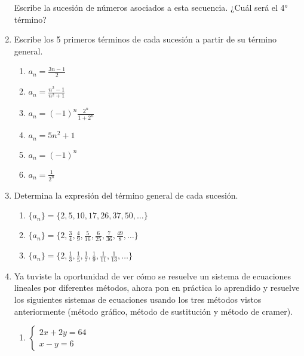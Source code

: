 \documentclass[12pt,a4paper]{article}
\begin{document}
\begin{enumerate}
    Escribe la sucesión de números asociados a esta secuencia. ¿Cuál será el 4° término?

    \item Escribe los 5 primeros términos de cada sucesión a partir de su término general.

    \begin{enumerate}[label=\alph*.]
        \item $a_n = \frac{3n - 1}{2}$

        \item $a_n = \frac{n^2 - 1}{n^2 + 1}$

        \item $a_n = (-1)^n \frac{2^n}{1 + 2^n}$

        \item $a_n = 5n^2 + 1$

        \item $a_n = (-1)^n$

        \item $a_n = \frac{1}{2^n}$
    \end{enumerate}

    \item Determina la expresión del término general de cada sucesión.

    \begin{enumerate}[label=\alph*.]
        \item $\{a_n\} = \{2, 5, 10, 17, 26, 37, 50, \ldots\}$

        \item $\{a_n\} = \{2, \frac{3}{4}, \frac{4}{9}, \frac{5}{16}, \frac{6}{25}, \frac{7}{36}, \frac{49}{8}, \ldots\}$

        \item $\{a_n\} = \{2, \frac{1}{3}, \frac{1}{5}, \frac{1}{7}, \frac{1}{9}, \frac{1}{11}, \frac{1}{13}, \ldots\}$
    \end{enumerate}

    \item Ya tuviste la oportunidad de ver cómo se resuelve un sistema de ecuaciones lineales por diferentes métodos, ahora pon en práctica lo aprendido y resuelve los siguientes sistemas de ecuaciones usando los tres métodos vistos anteriormente (método gráfico, método de sustitución y método de cramer).

    \begin{enumerate}[label=\alph*.]
        \item $\begin{cases} 2x + 2y = 64 \\ x - y = 6 \end{cases}$


\end{enumerate}
\end{enumerate}
\end{document}
